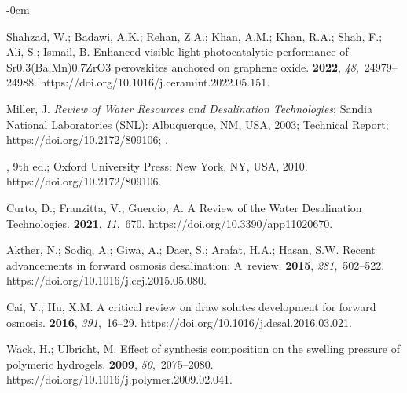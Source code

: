 \documentclass[gels,article,accept,pdftex,moreauthors]{Definitions/mdpi}
\begin{document}
\begin{adjustwidth}{-\extralength}{0cm}
\begin{thebibliography}{999}
Shahzad, W.; Badawi, A.K.; Rehan, Z.A.; Khan, A.M.; Khan, R.A.; Shah, F.; Ali,
  S.; Ismail, B.
\newblock Enhanced visible light photocatalytic performance of
  Sr0.3(Ba,Mn)0.7ZrO3 perovskites anchored on graphene oxide.
 {\bf 2022}, {\em 48},~24979--24988.
\newblock
  https://doi.org/10.1016/j.ceramint.2022.05.151.%

Miller, J.
\newblock \emph{Review of Water Resources and Desalination Technologies}; 
Sandia National Laboratories (SNL): Albuquerque, NM, USA, 2003;
\newblock Technical Report; 
\newblock https://doi.org/10.2172/809106; 
.


, 9th ed.; Oxford University Press:
  New York, NY, USA, 2010.
\newblock
  https://doi.org/10.2172/809106.%

Curto, D.; Franzitta, V.; Guercio, A.
\newblock A Review of the Water Desalination Technologies.
 {\bf 2021}, {\em 11},~670.
\newblock
  https://doi.org/10.3390/app11020670.%

Akther, N.; Sodiq, A.; Giwa, A.; Daer, S.; Arafat, H.A.; Hasan, S.W.
\newblock Recent advancements in forward osmosis desalination: A~review.
 {\bf 2015}, {\em 281},~502--522.
\newblock
  https://doi.org/10.1016/j.cej.2015.05.080.%

Cai, Y.; Hu, X.M.
\newblock A critical review on draw solutes development for forward osmosis.
 {\bf 2016}, {\em 391},~16--29.
\newblock
  https://doi.org/10.1016/j.desal.2016.03.021.%

Wack, H.; Ulbricht, M.
\newblock Effect of synthesis composition on the swelling pressure of polymeric
  hydrogels.
 {\bf 2009}, {\em 50},~2075--2080.
\newblock
  https://doi.org/10.1016/j.polymer.2009.02.041.%


\end{thebibliography}
\end{adjustwidth}
\end{document}
